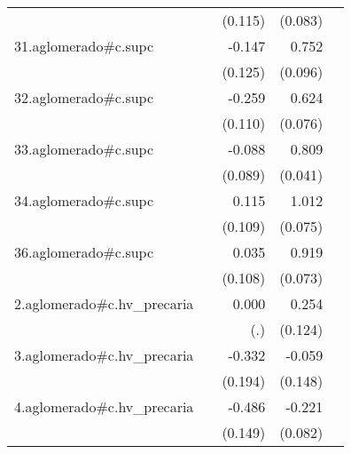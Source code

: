 {\begin{longtable}{l*{4}{D{.}{.}{-1}}}
            &                     &     (0.115)         &     (0.083)         &                     \\
\addlinespace
31.aglomerado#c.supc&                     &      -0.147         &       0.752\sym{***}&                     \\
            &                     &     (0.125)         &     (0.096)         &                     \\
\addlinespace
32.aglomerado#c.supc&                     &      -0.259\sym{*}  &       0.624\sym{***}&                     \\
            &                     &     (0.110)         &     (0.076)         &                     \\
\addlinespace
33.aglomerado#c.supc&                     &      -0.088         &       0.809\sym{***}&                     \\
            &                     &     (0.089)         &     (0.041)         &                     \\
\addlinespace
34.aglomerado#c.supc&                     &       0.115         &       1.012\sym{***}&                     \\
            &                     &     (0.109)         &     (0.075)         &                     \\
\addlinespace
36.aglomerado#c.supc&                     &       0.035         &       0.919\sym{***}&                     \\
            &                     &     (0.108)         &     (0.073)         &                     \\
\addlinespace
2.aglomerado#c.hv\_precaria&                     &       0.000         &       0.254\sym{*}  &                     \\
            &                     &         (.)         &     (0.124)         &                     \\
\addlinespace
3.aglomerado#c.hv\_precaria&                     &      -0.332         &      -0.059         &                     \\
            &                     &     (0.194)         &     (0.148)         &                     \\
\addlinespace
4.aglomerado#c.hv\_precaria&                     &      -0.486\sym{**} &      -0.221\sym{**} &                     \\
            &                     &     (0.149)         &     (0.082)         &                     \\

\end{longtable}}
